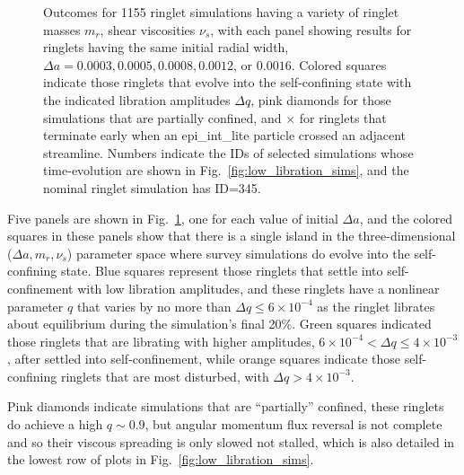\documentclass[preprint]{aastex62}
\begin{document}
\begin{figure}
    \caption{
        \label{fig:sim_grid_da}
        Outcomes for 1155 ringlet simulations having a variety of ringlet
        masses $m_r$, shear viscosities $\nu_s$, with each panel showing results
        for ringlets having the same initial radial width,
        $\Delta a=0.0003, 0.0005, 0.0008, 0.0012$, or  $0.0016$. Colored squares indicate
        those ringlets that evolve into the self-confining state with the indicated libration
        amplitudes $\Delta q$, pink diamonds for those simulations that are partially confined, 
        and $\times$ for ringlets that terminate early when an epi\_int\_lite particle crossed an 
        adjacent streamline. Numbers indicate the IDs of selected simulations whose time-evolution
        are shown in Fig.\ \ref{fig:low_libration_sims}, and the nominal ringlet
        simulation has ID=345.
    }
\end{figure}

Five panels are shown in Fig.\ \ref{fig:sim_grid_da},  one for each value of initial $\Delta a$,
and the colored squares in these panels show that there is a single 
island in the three-dimensional ($\Delta a, m_r, \nu_s$) parameter space where survey
simulations do evolve into the self-confining state. Blue squares represent those ringlets
that settle into self-confinement with low libration amplitudes, and these ringlets
have a nonlinear parameter $q$ that varies by no more than $\Delta q \le 6\times10^{-4}$ 
as the ringlet librates about equilibrium during the simulation's final 20\%.
Green squares indicated those ringlets that are librating with higher amplitudes, 
$6\times10^{-4} < \Delta q \le 4\times10^{-3}$, after settled into self-confinement, 
while orange squares indicate those self-confining ringlets that are most disturbed,
with $\Delta q > 4\times10^{-3}$.

Pink diamonds indicate simulations that are ``partially'' confined, these ringlets
do achieve a high $q\sim0.9$, but angular momentum flux reversal is not complete
and so their viscous spreading is only slowed not stalled, which 
is also detailed in the lowest row of plots in Fig.\ \ref{fig:low_libration_sims}.
\end{document}
